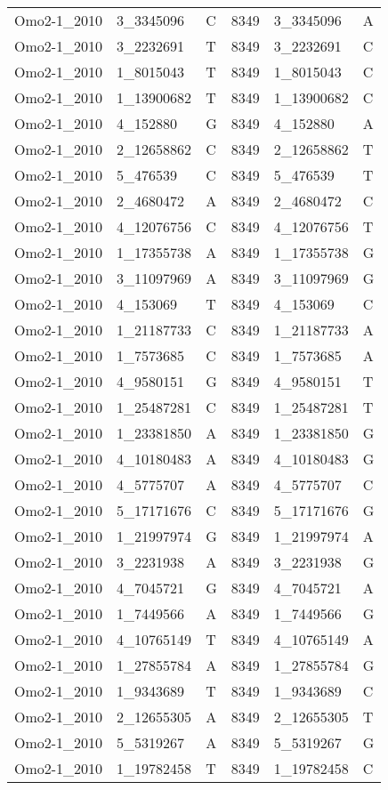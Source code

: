 \begin{center}
\begin{longtable}{|l|l|l|l|l|l|}
Omo2-1\_2010&3\_3345096&C&8349&3\_3345096&A\\
Omo2-1\_2010&3\_2232691&T&8349&3\_2232691&C\\
Omo2-1\_2010&1\_8015043&T&8349&1\_8015043&C\\
Omo2-1\_2010&1\_13900682&T&8349&1\_13900682&C\\
Omo2-1\_2010&4\_152880&G&8349&4\_152880&A\\
Omo2-1\_2010&2\_12658862&C&8349&2\_12658862&T\\
Omo2-1\_2010&5\_476539&C&8349&5\_476539&T\\
Omo2-1\_2010&2\_4680472&A&8349&2\_4680472&C\\
Omo2-1\_2010&4\_12076756&C&8349&4\_12076756&T\\
Omo2-1\_2010&1\_17355738&A&8349&1\_17355738&G\\
Omo2-1\_2010&3\_11097969&A&8349&3\_11097969&G\\
Omo2-1\_2010&4\_153069&T&8349&4\_153069&C\\
Omo2-1\_2010&1\_21187733&C&8349&1\_21187733&A\\
Omo2-1\_2010&1\_7573685&C&8349&1\_7573685&A\\
Omo2-1\_2010&4\_9580151&G&8349&4\_9580151&T\\
Omo2-1\_2010&1\_25487281&C&8349&1\_25487281&T\\
Omo2-1\_2010&1\_23381850&A&8349&1\_23381850&G\\
Omo2-1\_2010&4\_10180483&A&8349&4\_10180483&G\\
Omo2-1\_2010&4\_5775707&A&8349&4\_5775707&C\\
Omo2-1\_2010&5\_17171676&C&8349&5\_17171676&G\\
Omo2-1\_2010&1\_21997974&G&8349&1\_21997974&A\\
Omo2-1\_2010&3\_2231938&A&8349&3\_2231938&G\\
Omo2-1\_2010&4\_7045721&G&8349&4\_7045721&A\\
Omo2-1\_2010&1\_7449566&A&8349&1\_7449566&G\\
Omo2-1\_2010&4\_10765149&T&8349&4\_10765149&A\\
Omo2-1\_2010&1\_27855784&A&8349&1\_27855784&G\\
Omo2-1\_2010&1\_9343689&T&8349&1\_9343689&C\\
Omo2-1\_2010&2\_12655305&A&8349&2\_12655305&T\\
Omo2-1\_2010&5\_5319267&A&8349&5\_5319267&G\\
Omo2-1\_2010&1\_19782458&T&8349&1\_19782458&C\\

\end{longtable}
\end{center}
